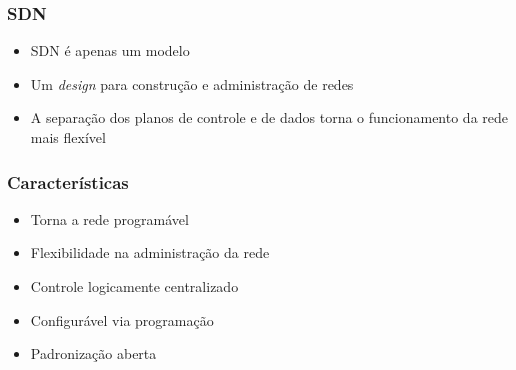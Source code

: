 %
%
\begin{frame}\frametitle{SDN}

    \begin{itemize}
    \item SDN é apenas um modelo
    \vspace*{0.5cm}
    \item Um \emph{design} para construção e administração de redes
    \vspace*{0.5cm}
    \item A separação dos planos de controle e de dados torna o 
          funcionamento da rede mais flexível
    \end{itemize}
\end{frame}

%
%
\begin{frame}\frametitle{Características}

    \begin{itemize}
    \item Torna a rede programável
    \vspace*{0.1cm}
    \item Flexibilidade na administração da rede
    \vspace*{0.1cm}
    \item Controle logicamente centralizado
    \vspace*{0.1cm}
    \item Configurável via programação
    \vspace*{0.1cm}
    \item Padronização aberta 
    \end{itemize}
\end{frame}

